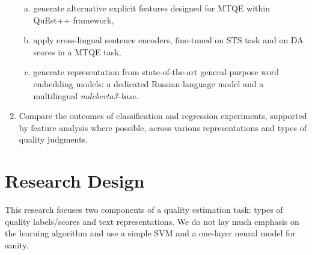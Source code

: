 \begin{enumerate}
\begin{enumerate}[(a)]
		\item generate alternative explicit features designed for \gls*{MTQE} within QuEst++ framework, 
		\item apply cross-lingual sentence encoders, fine-tuned on \gls{STS} task and on DA scores in a \gls*{MTQE} task, %
		\item generate representation from state-of-the-art general-purpose word embedding models: a dedicated Russian language model and a multilingual \textit{mdeberta3-base}.
	\end{enumerate} 
	\item Compare the outcomes of classification and regression experiments, supported by feature analysis where possible, across various representations and types of quality judgments.
\end{enumerate}

\section{\label{ssec:design}Research Design} 
This research focuses two components of a quality estimation task: types of quality labels/scores and text representations. We do not lay much emphasis on the learning algorithm and use a simple \gls{SVM} and a one-layer neural model for sanity. 

